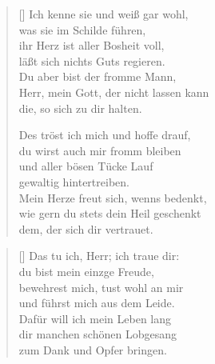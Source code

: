 \begin{multicols}{2}
\begin{verse}[\versewidth]
 Ich kenne sie und weiß gar wohl,\\
was sie im Schilde führen,\\
ihr Herz ist aller Bosheit voll,\\
läßt sich nichts Guts regieren.\\
Du aber bist der fromme Mann,\\
Herr, mein Gott, der nicht lassen kann\\
die, so sich zu dir halten.

 Des tröst ich mich und hoffe drauf,\\  %
du wirst auch mir fromm bleiben\\
und aller bösen Tücke Lauf\\
gewaltig hintertreiben.\\
Mein Herze freut sich, wenns bedenkt,\\
wie gern du stets dein Heil geschenkt\\
dem, der sich dir vertrauet.

\end{verse}
\end{multicols}

\begin{center}
\settowidth{\versewidth}{Ach Herr, wie lange willst du mein}
\begin{verse}[\versewidth]
 Das tu ich, Herr; ich traue dir:\\
du bist mein einzge Freude,\\
bewehrest mich, tust wohl an mir\\
und führst mich aus dem Leide.\\
Dafür will ich mein Leben lang\\
dir manchen schönen Lobgesang\\
zum Dank und Opfer bringen.
\end{verse}
\end{center}

